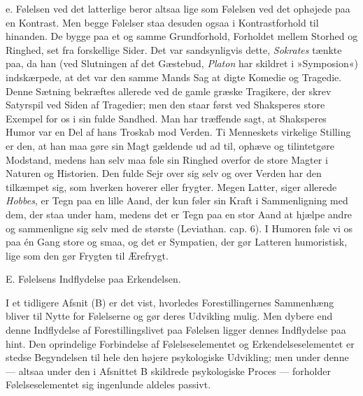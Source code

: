 \documentclass[12pt,a4paper,openany]{book}
\newcommand{\opage}[1]{\marginnote{\footnotesize\textit{[#1]}}}
\begin{document}
e. Følelsen ved det latterlige beror altsaa lige som Følelsen ved det
ophøjede paa en Kontrast. Men begge Følelser staa desuden ogsaa i
Kontrastforhold til hinanden. De bygge paa et og samme Grundforhold,
Forholdet mellem Storhed og Ringhed, set fra forskellige Sider. Det var
sandsynligvis dette, \emph{Sokrates} tænkte paa, da han (ved Slutningen
af det Gæstebud, \emph{Platon} har skildret i »Symposion«) indskærpede,
at det var den samme Mands Sag at digte Komedie og Tragedie. Denne
Sætning bekræftes allerede ved de gamle græske Tragikere, der skrev
Satyrspil ved Siden af Tragedier; men den staar først ved Shaksperes
store Exempel for os i sin fulde Sandhed. Man har træffende sagt, at
Shaksperes Humor var en Del af hans Troskab mod Verden. Ti Menneskets
virkelige Stilling er den, at han maa gøre sin Magt gældende ud ad til,
ophæve og tilintetgøre Modstand, medens han selv maa føle sin Ringhed
overfor de store Magter i Naturen og Historien. Den fulde Sejr over sig
selv og over Verden har den tilkæmpet sig, som hverken hoverer eller
frygter. Megen Latter, siger allerede \emph{Hobbes}, er Tegn paa en
lille Aand, der kun føler sin Kraft i Sammenligning med dem, der staa
under ham, medens det er Tegn paa en stor Aand at hjælpe andre og
sammenligne sig selv med de største (Leviathan. cap. 6). I Humoren føle
vi os paa én Gang store og smaa, og det er Sympatien, der gør Latteren
humoristisk, lige som den gør Frygten til Ærefrygt.

\opage{352}
\begin{center}E. Følelsens Indflydelse paa Erkendelsen.\end{center}

I et tidligere Afsnit (B) er det vist, hvorledes Forestillingernes
Sammenhæng bliver til Nytte for Følelserne og gør deres Udvikling mulig.
Men dybere end denne Indflydelse af Forestillingslivet paa Følelsen
ligger dennes Indflydelse paa hint. Den oprindelige Forbindelse af
Følelseselementet og Erkendelseselementet er stedse Begyndelsen til hele
den højere psykologiske Udvikling; men under denne --- altsaa under den
i Afsnittet B skildrede psykologiske Proces --- forholder
Følelseselementet sig ingenlunde aldeles passivt.
\end{document}
